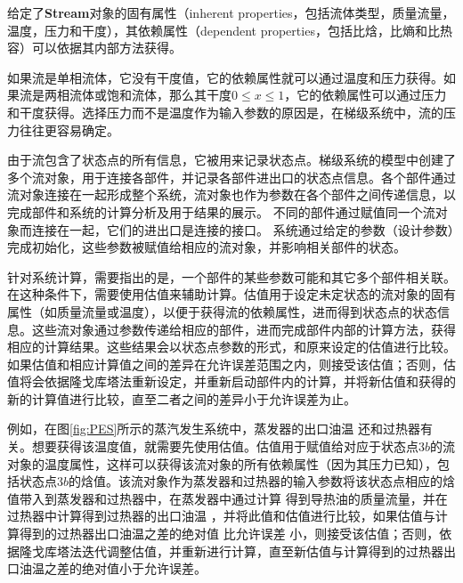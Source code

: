 给定了\textbf{Stream}对象的固有属性（inherent properties，包括流体类型，质量流量，温度，压力和干度），其依赖属性（dependent properties，包括比焓，比熵和比热容）可以依据其内部方法获得。

如果流是单相流体，它没有干度值，它的依赖属性就可以通过温度和压力获得。如果流是两相流体或饱和流体，那么其干度$0 \leqslant x \leqslant 1$，它的依赖属性可以通过压力和干度获得。选择压力而不是温度作为输入参数的原因是，在梯级系统中，流的压力往往更容易确定。

由于流包含了状态点的所有信息，它被用来记录状态点。梯级系统的模型中创建了多个流对象，用于连接各部件，并记录各部件进出口的状态点信息。各个部件通过流对象连接在一起形成整个系统，流对象也作为参数在各个部件之间传递信息，以完成部件和系统的计算分析及用于结果的展示。
不同的部件通过赋值同一个流对象而连接在一起，它们的进出口是连接的接口。
系统通过给定的参数（设计参数）完成初始化，这些参数被赋值给相应的流对象，并影响相关部件的状态。

针对系统计算，需要指出的是，一个部件的某些参数可能和其它多个部件相关联。
在这种条件下，需要使用估值来辅助计算。估值用于设定未定状态的流对象的固有属性（如质量流量或温度），以便于获得流的依赖属性，进而得到状态点的状态信息。这些流对象通过参数传递给相应的部件，进而完成部件内部的计算方法，获得相应的计算结果。这些结果会以状态点参数的形式，和原来设定的估值进行比较。如果估值和相应计算值之间的差异在允许误差范围之内，则接受该估值；否则，估值将会依据隆戈库塔法重新设定，并重新启动部件内的计算，并将新估值和获得的新的计算值进行比较，直至二者之间的差异小于允许误差为止。

例如，在图\ref{fig:PES}所示的蒸汽发生系统中，蒸发器的出口油温%
还和过热器有关。想要获得该温度值，就需要先使用估值。估值用于赋值给对应于状态点$3b$的流对象的温度属性，这样可以获得该流对象的所有依赖属性（因为其压力已知），包括状态点$3b$的焓值。该流对象作为蒸发器和过热器的输入参数将该状态点相应的焓值带入到蒸发器和过热器中，在蒸发器中通过计算
得到导热油的质量流量，并在过热器中计算得到过热器的出口油温
，并将此值和估值进行比较，如果估值与计算得到的过热器出口油温之差的绝对值
比允许误差
小，则接受该估值；否则，依据隆戈库塔法迭代调整估值，并重新进行计算，直至新估值与计算得到的过热器出口油温之差的绝对值小于允许误差。

